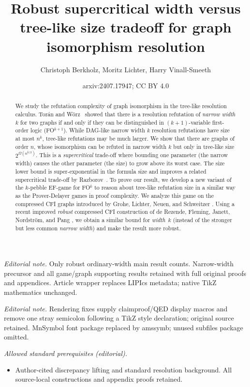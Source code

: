 \documentclass[10pt,a4paper]{article}
\title{Robust supercritical width versus tree-like size tradeoff for graph isomorphism resolution}
\author{Christoph Berkholz, Moritz Lichter, Harry Vinall-Smeeth}
\date{arxiv:2407.17947; CC BY 4.0}
\newcommand{\confORfull}[2]{#1}
\begin{document}
\maketitle
\noindent\textit{Editorial note.} Only robust ordinary-width main result counts. Narrow-width precursor and all game/graph supporting results retained with full original proofs and appendices. Article wrapper replaces LIPIcs metadata; native TikZ mathematics unchanged.\par\medskip
\noindent\textit{Editorial note.} Rendering fixes supply claimproof/QED display macros and remove one stray semicolon following a TikZ style declaration; original source retained. MnSymbol font package replaced by amssymb; unused subfiles package omitted.\par\medskip
\noindent\textit{Allowed standard prerequisites (editorial).}\begin{itemize}
\item Author-cited discrepancy lifting and standard resolution background. All source-local constructions and appendix proofs retained.
\end{itemize}\medskip
        
        \maketitle
        
%


\begin{abstract}
We study the refutation complexity of graph isomorphism in the
tree-like resolution calculus.
Torán and Wörz~\cite{DBLP:journals/tocl/ToranW23} showed that 
there is a resolution refutation of \emph{narrow width} $k$ for two graphs if and only if
they can be distinguished in $(k+1)$-variable first-order logic (FO$^{k+1}$)\confORfull{}{ and
hence by a count-free variant of the $k$-dimensional
Weisfeiler-Leman algorithm}.
While DAG-like narrow width $k$ resolution refutations have size at most $n^k$, tree-like refutations
may be much larger.
We show that there are
graphs of order $n$, whose isomorphism can be refuted in narrow width $k$ 
but only in tree-like size $2^{\Omega(n^{k/2})}$.
%
This is a \emph{supercritical} trade-off where bounding one
parameter (the narrow width) causes the other parameter (the size) to
grow above its worst case. The size lower bound is super-exponential
in the formula size and improves a related supercritical\confORfull{}{ width versus tree-like size} trade-off by Razborov~\cite{DBLP:journals/jacm/Razborov16}.\confORfull{}{\\}
To prove our result, we develop a new variant of the $k$-pebble
EF-game for FO$^k$ to reason about tree-like refutation
size in a similar way as the Prover-Delayer games in proof
complexity. We analyze this game on the compressed CFI graphs introduced by Grohe, Lichter,
Neuen, and Schweitzer \cite{DBLP:conf/focs/GroheLNS23}.
Using a recent improved
\emph{robust} compressed CFI construction of de Rezende, Fleming, Janett, Nordström, and Pang \cite{RFJN024},
we obtain a similar bound for \emph{width}~$k$ (instead of the
stronger but less common \emph{narrow width}) and make the
result more robust.
\end{abstract}         
        
\end{document}
